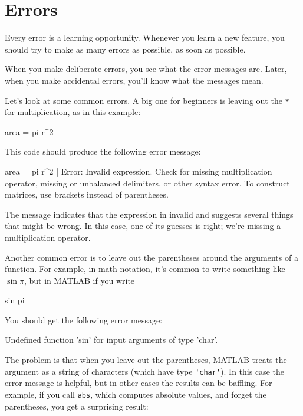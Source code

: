 

\section{Errors}


Every error is a learning opportunity.
Whenever you learn a new feature, you should try to make as many errors as possible, as soon as possible.

When you make deliberate errors, you see what the error messages are.
Later, when you make accidental errors, you'll know what the messages mean.

Let's look at some common errors. A big one for beginners is leaving out the \lstinline{*}
for multiplication, as in this example:

\begin{code}
area = pi r^2
\end{code}

This code should produce the following error message:

\begin{stdout}
 area = pi r^2
           |
Error: Invalid expression. Check for missing multiplication 
operator, missing or unbalanced delimiters, or other syntax 
error. To construct matrices, use brackets instead of parentheses.
\end{stdout}


The message indicates that the expression in invalid and suggests several things that might be wrong.
In this case, one of its guesses is right; we're missing a multiplication operator.


Another common error is to leave out the parentheses around the
arguments of a function.  For example, in math notation, it's common
to write something like $\sin \pi$, but in MATLAB if you write

\begin{code}
sin pi
\end{code}

You should get the following error message:

\begin{stdout}
Undefined function 'sin' for input arguments of type 'char'.
\end{stdout}

The problem is that when you leave out the parentheses, MATLAB treats
the argument as a string of characters (which have type \lstinline{'char'}).
In this case the error message is helpful, but in other cases the results can be baffling.
For example, if you call \lstinline{abs}, which computes absolute values, and forget the parentheses, you get a surprising result:

